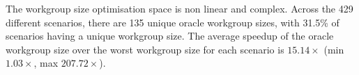 \documentclass[nonatbib,preprint,10pt]{sigplanconf}
\begin{document}
The workgroup size optimisation space is non linear and
complex. Across the 429 different scenarios, there are 135 unique
oracle workgroup sizes, with 31.5\% of scenarios having a unique
workgroup size.
The average speedup of the oracle workgroup size over the worst
workgroup size for each scenario is $15.14\times$ (min $1.03\times$,
max
$207.72\times$). %


\end{document}

